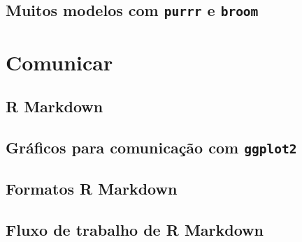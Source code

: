\documentclass[
]{book}
\theoremstyle{definition}
\theoremstyle{definition}
\theoremstyle{definition}
\theoremstyle{definition}
\theoremstyle{remark}
\begin{document}
\hypertarget{muitos-modelos-com-purrr-e-broom}{%
\chapter{\texorpdfstring{Muitos modelos com \texttt{purrr} e \texttt{broom}}{Muitos modelos com purrr e broom}}\label{muitos-modelos-com-purrr-e-broom}}

\hypertarget{part-comunicar}{%
\part{Comunicar}\label{part-comunicar}}

\hypertarget{r-markdown}{%
\chapter{R Markdown}\label{r-markdown}}

\hypertarget{gruxe1ficos-para-comunicauxe7uxe3o-com-ggplot2}{%
\chapter{\texorpdfstring{Gráficos para comunicação com \texttt{ggplot2}}{Gráficos para comunicação com ggplot2}}\label{gruxe1ficos-para-comunicauxe7uxe3o-com-ggplot2}}

\hypertarget{formatos-r-markdown}{%
\chapter{Formatos R Markdown}\label{formatos-r-markdown}}

\hypertarget{fluxo-de-trabalho-de-r-markdown}{%
\chapter{Fluxo de trabalho de R Markdown}\label{fluxo-de-trabalho-de-r-markdown}}

  
\end{document}
